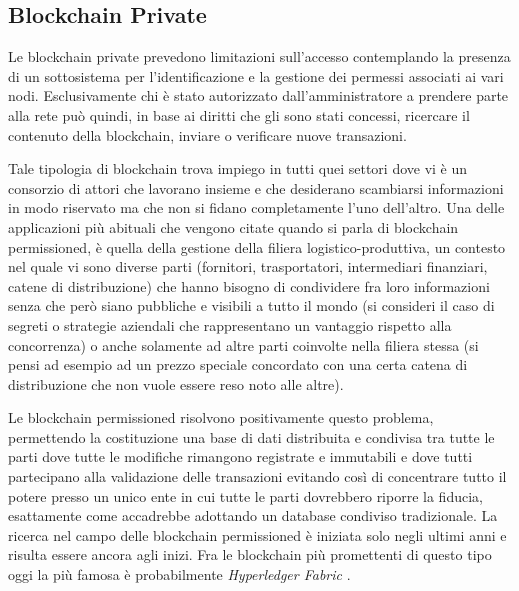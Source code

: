 \subsection{Blockchain Private}
Le blockchain private prevedono limitazioni sull'accesso contemplando la presenza di un sottosistema per l'identificazione e la gestione dei permessi associati ai vari nodi. Esclusivamente chi è stato autorizzato dall'amministratore a prendere parte alla rete può quindi, in base ai diritti che gli sono stati concessi, ricercare il contenuto della blockchain, inviare o verificare nuove transazioni.

Tale tipologia di blockchain trova impiego in tutti quei settori dove vi è un consorzio di attori che lavorano insieme e che desiderano scambiarsi informazioni in modo riservato ma che non si fidano completamente l'uno dell'altro. Una delle applicazioni più abituali che vengono citate quando si parla di blockchain permissioned, è quella della gestione della filiera logistico-produttiva, un contesto nel quale vi sono diverse parti (fornitori, trasportatori, intermediari finanziari, catene di distribuzione) che hanno bisogno di condividere fra loro informazioni senza che però siano pubbliche e visibili a tutto il mondo (si consideri il caso di segreti o strategie aziendali che rappresentano un vantaggio rispetto alla concorrenza) o anche solamente ad altre parti coinvolte nella filiera stessa (si pensi ad esempio ad un prezzo speciale concordato con una certa catena di distribuzione che non vuole essere reso noto alle altre).

Le blockchain permissioned risolvono positivamente questo problema, permettendo la costituzione una base di dati distribuita e condivisa tra tutte le parti dove tutte le modifiche rimangono registrate e immutabili e dove tutti partecipano alla validazione delle transazioni evitando così di concentrare tutto il potere presso un unico ente in cui tutte le parti dovrebbero riporre la fiducia, esattamente come accadrebbe adottando un database condiviso tradizionale. La ricerca nel campo delle blockchain permissioned è iniziata solo negli ultimi anni e risulta essere ancora agli inizi. Fra le blockchain più promettenti di questo tipo oggi la più famosa è probabilmente \textit{Hyperledger Fabric} \cite{10.1145/3190508.3190538}.

